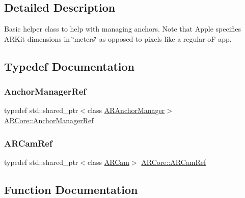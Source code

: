 \subsection{Detailed Description}
Basic helper class to help with managing anchors. Note that Apple specifies A\+R\+Kit dimensions in \char`\"{}meters\char`\"{} as opposed to pixels like a regular oF app. 

\subsection{Typedef Documentation}
\mbox{\label{namespace_a_r_core_a3f2b9ba00b51ce19c1010f554a66a512}} 
\subsubsection{\texorpdfstring{Anchor\+Manager\+Ref}{AnchorManagerRef}}
{\footnotesize\ttfamily typedef std\+::shared\+\_\+ptr$<$class \mbox{\hyperlink{class_a_r_core_1_1_a_r_anchor_manager}{A\+R\+Anchor\+Manager}}$>$ \mbox{\hyperlink{namespace_a_r_core_a3f2b9ba00b51ce19c1010f554a66a512}{A\+R\+Core\+::\+Anchor\+Manager\+Ref}}}

\mbox{\label{namespace_a_r_core_a4ebe9e23907235fcf76bf65440fde0e0}} 
\subsubsection{\texorpdfstring{A\+R\+Cam\+Ref}{ARCamRef}}
{\footnotesize\ttfamily typedef std\+::shared\+\_\+ptr$<$class \mbox{\hyperlink{class_a_r_core_1_1_a_r_cam}{A\+R\+Cam}}$>$ \mbox{\hyperlink{namespace_a_r_core_a4ebe9e23907235fcf76bf65440fde0e0}{A\+R\+Core\+::\+A\+R\+Cam\+Ref}}}



\subsection{Function Documentation}
\mbox{\label{namespace_a_r_core_a66ae704f1eff4b085765cc73635db8eb}} 
